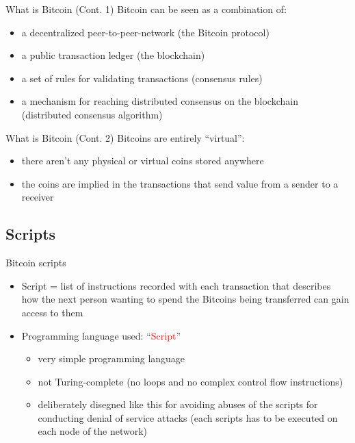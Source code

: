 \documentclass{beamer}
\newcommand\red[1]{\textcolor{red}{#1}}
\begin{document}
  \begin{frame}{What is Bitcoin (Cont. 1)}
    Bitcoin can be seen as a combination of:
    \begin{itemize}
      \item a decentralized peer-to-peer-network (the Bitcoin protocol)
      \item a public transaction ledger (the blockchain) 
      \item a set of rules for validating transactions (consensus rules) 
      \item a mechanism for reaching distributed consensus on the blockchain
      (distributed consensus algorithm) 
    \end{itemize}
  \end{frame}





  \begin{frame}{What is Bitcoin (Cont. 2)}
    Bitcoins are entirely ``virtual'':
    \begin{itemize}
      \item there aren't any physical or virtual coins stored anywhere 
      \item the coins are implied in the transactions that send value from a sender to
      a receiver
    \end{itemize}
  \end{frame}





  \subsection{Scripts}
  \begin{frame}{Bitcoin scripts}
    \begin{itemize}
      \item Script = list of instructions recorded with each transaction that describes
      how the next person wanting to spend the Bitcoins being transferred can gain access to them \pause 
      \item Programming language used: ``\red{Script}'' \cite{script-bitcoin-wiki} 
      \begin{itemize}
        \item very simple programming language 
        \item not Turing-complete {\tiny(no loops and no complex control flow instructions)} 
        \item deliberately disegned like this for avoiding abuses of the scripts
        for conducting denial of service attacks {\tiny(each scripts has to be
        executed on each node of the network)}
      \end{itemize}
    \end{itemize}
  \end{frame}
\end{document}
